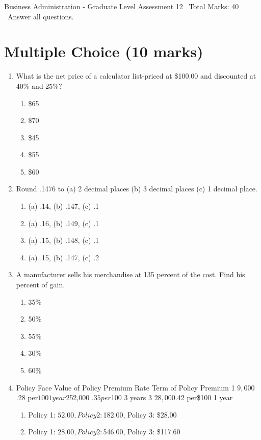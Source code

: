 \documentclass[12pt]{article}
\begin{document}
\begin{center}
Business Administration - Graduate Level Assessment 12 \
Total Marks: 40 \
Answer all questions.
\end{center}

\section*{Multiple Choice (10 marks)}
\begin{enumerate}[label=\arabic*.]
\item What is the net price of a calculator list-priced at \$100.00 and discounted at 40\% and 25\%?
\begin{enumerate}[label=(\alph*)]
    \item \$65
    \item \$70
    \item \$45
    \item \$55
    \item \$60
\end{enumerate}
\item Round .1476 to (a) 2 decimal places (b) 3 decimal places (c) 1 decimal place.
\begin{enumerate}[label=(\alph*)]
    \item (a) .14, (b) .147, (c) .1
    \item (a) .16, (b) .149, (c) .1
    \item (a) .15, (b) .148, (c) .1
    \item (a) .15, (b) .147, (c) .2
\end{enumerate}
\item A manufacturer sells his merchandise at 135 percent of the cost. Find his percent of gain.
\begin{enumerate}[label=(\alph*)]
    \item 35\%
    \item 50\%
    \item 55\%
    \item 30\%
    \item 60\%
\end{enumerate}
\item Policy Face Value of Policy Premium Rate Term of Policy Premium 1 $ 9,000 $.28 per$100 1 year 2 $52,000 $.35 per$100 3 years 3 $28,000 $.42 per\$100 1 year
\begin{enumerate}[label=(\alph*)]
    \item Policy 1: $52.00, Policy 2: $182.00, Policy 3: \$28.00
    \item Policy 1: $28.00, Policy 2: $546.00, Policy 3: \$117.60

\end{enumerate}
\end{enumerate}
\end{document}
